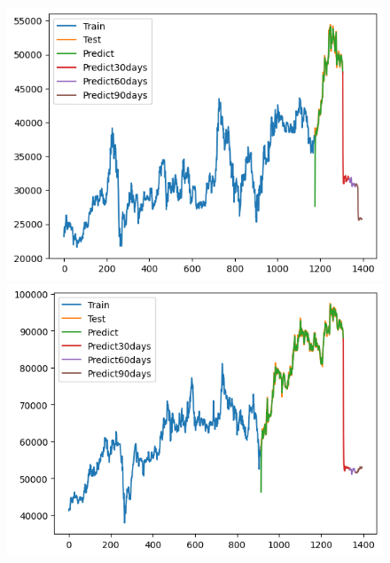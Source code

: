 \begin{figure}[H]
\begin{minipage}{0.15\textwidth}
    \centering
    \includegraphics[width=1\textwidth]{resources/chapter-5/newdata1/result/KF_BIDV_9_1.png}
    \end{minipage}
    \hfill
    \begin{minipage}{0.15\textwidth}
    \centering
    \includegraphics[width=1\textwidth]{resources/chapter-5/newdata1/result/KF_VCB_7_3.png}
    \end{minipage}
    \hfill
    \begin{minipage}{0.15\textwidth}
    \centering

\end{minipage}
\end{figure}
